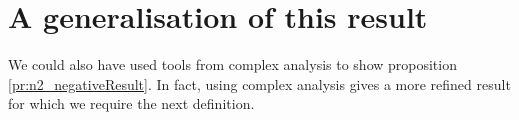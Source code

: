 
\section{A generalisation of this result}

We could also have used tools from complex analysis to show proposition \ref{pr:n2_negativeResult}.
In fact, using complex analysis \cite{Alessandrini1992} gives a more refined result
for which we require the next definition.

